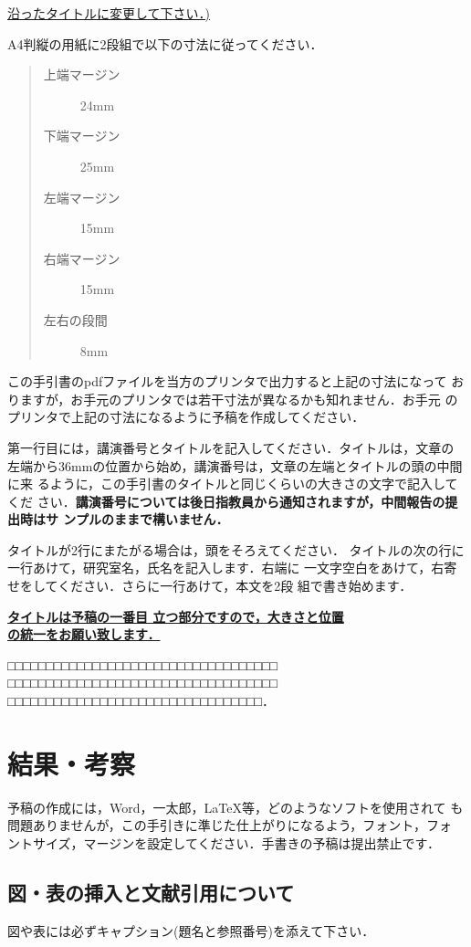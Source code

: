 \documentclass[10pt,twocolumn, a4j]{jsarticle}
\begin{document}
\underline{沿ったタイトルに変更して下さい．)}

A4判縦の用紙に2段組で以下の寸法に従ってください．

\begin{quote}
\begin{description}
\item[上端マージン] 24mm
\item[下端マージン] 25mm
\item[左端マージン] 15mm
\item[右端マージン] 15mm
\item[左右の段間] 8mm
\end{description}
\end{quote}

この手引書のpdfファイルを当方のプリンタで出力すると上記の寸法になって
おりますが，お手元のプリンタでは若干寸法が異なるかも知れません．お手元
のプリンタで上記の寸法になるように予稿を作成してください．


第一行目には，講演番号とタイトルを記入してください．タイトルは，文章の
左端から36mmの位置から始め，講演番号は，文章の左端とタイトルの頭の中間に来
るように，この手引書のタイトルと同じくらいの大きさの文字で記入してくだ
さい．{\bf 講演番号については後日指教員から通知されますが，中間報告の提出時はサ
ンプルのままで構いません．}

タイトルが2行にまたがる場合は，頭をそろえてください．
タイトルの次の行に一行あけて，研究室名，氏名を記入します．右端に
一文字空白をあけて，右寄せをしてください．さらに一行あけて，本文を2段
組で書き始めます．

{\bf \underline{タイトルは予稿の一番目
立つ部分ですので，大きさと位置}}\\
{\bf \underline{の統一をお願い致します．}}

□□□□□□□□□□□□□□□□□□□□□□□□□□□□□□□□□□□
□□□□□□□□□□□□□□□□□□□□□□□□□□□□□□□□□□□
□□□□□□□□□□□□□□□□□□□□□□□□□□□□□□□□□．

\section{結果・考察}
予稿の作成には，Word，一太郎，\LaTeX 等，どのようなソフトを使用されて
も問題ありませんが，この手引きに準じた仕上がりになるよう，フォント，フォ
ントサイズ，マージンを設定してください．手書きの予稿は提出禁止です．

\subsection{図・表の挿入と文献引用について}
図や表には必ずキャプション{\scriptsize (題名と参照番号)}を添えて下さい．
\end{document}
